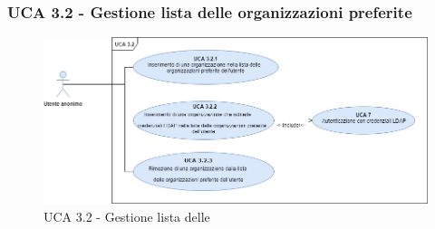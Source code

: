 \subsubsection{UCA 3.2 - Gestione lista delle organizzazioni preferite}%
\begin{figure}[h]
	\centering
	\includegraphics[scale=0.45 , center]{Sezioni/UseCase/Immagini/UCA3.2.png}
	\caption{UCA 3.2 - Gestione lista delle }
\end{figure}
